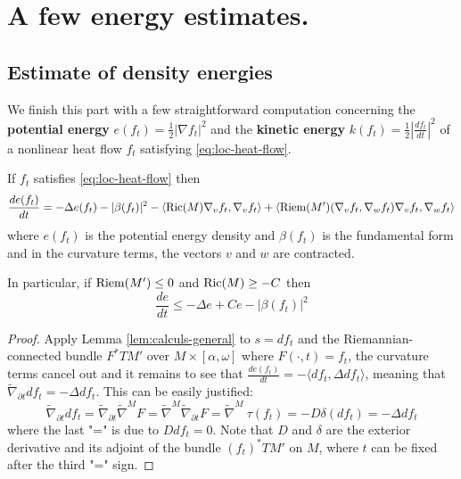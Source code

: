 \section{A few energy estimates.}
\label{sec:org28e23b9}
\subsection{Estimate of density energies}
\label{sec:org33caa85}
We finish this part with a few straightforward computation concerning the \textbf{potential
energy} \(e(f_t) = \frac{1}{2}|\nabla f_t|^2\) and the \textbf{kinetic energy} \(k(f_t) =
\frac{1}{2}|\frac{d f_t}{d t}|^2\) of a nonlinear heat flow \(f_t\)
satisfying \eqref{eq:loc-heat-flow}.

\begin{theorem}
\label{thm:den-pot}
If \(f_t\) satisfies \eqref{eq:loc-heat-flow} then 
\[
 \frac{d e(f_t)}{dt}= -\Delta e(f_t) - |\beta(f_t)|^2 - \left\langle \mathop{\rm Ric}\nolimits(M) \nabla_v
f_t,\nabla_v f_t \rangle + \langle \mathop{\rm Riem}\nolimits(M') (\nabla_v f_t,\nabla_w f_t)\nabla_v
f_t,\nabla_w f_t \right\rangle
\]
where \(e(f_t)\) is the potential energy density and \(\beta(f_t)\) is the fundamental
form and in the curvature terms, the vectors \(v\) and \(w\) are contracted.

In particular, if  \(\mathop{\rm Riem}\nolimits(M') \leq 0\) and \(\mathop{\rm Ric}\nolimits(M)\geq -C\) then
\begin{equation}
\label{eq:den-pot-est}
\frac{d e}{dt} \leq -\Delta e + Ce - |\beta(f_t)|^2
\end{equation}
\end{theorem}
\begin{proof}
Apply Lemma \ref{lem:calculs-general} to \(s = d f_t\) and the Riemannian-connected
bundle \(F^* TM'\) over \(M\times [\alpha,\omega]\) where \(F(\cdot,t) = f_t\), the curvature terms cancel
out and it remains to see that
\(\frac{d e(f_t)}{dt}= - \langle df_t, \Delta df_t \rangle\), meaning that \(\tilde \nabla_{\partial t} df_t = -\Delta df_t\). This can be easily
justified:
\[
\tilde \nabla_{\partial t} df_t = \tilde \nabla_{\partial t} \tilde\nabla^M F=  \tilde\nabla^M
\tilde\nabla_{\partial t} F= \tilde\nabla^M\ \tau (f_t) = -D\delta (df_t) = -\Delta df_t
\]
where the last "=" is due to \(D df_t = 0\). Note that \(D\) and \(\delta\)
are the exterior derivative and its adjoint of the bundle \((f_t)^*TM'\) on \(M\),
where \(t\) can be fixed after the third "=" sign.
\end{proof}

